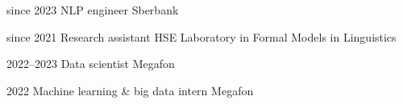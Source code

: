 

\begin{cvskills}


  \cvskill
    {since 2023} %
    {NLP engineer} %
    {Sberbank} %

  \cvskill
    {since 2021} %
    {Research assistant} %
    {HSE Laboratory in Formal Models in Linguistics} %

  \cvskill
    {2022--2023} %
    {Data scientist} %
    {Megafon} %

  \cvskill
    {2022} %
    {Machine learning \& big data intern} %
    {Megafon} %

\end{cvskills}
